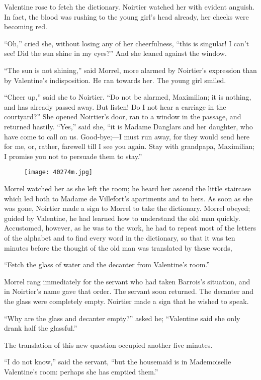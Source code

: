 Valentine rose to fetch the dictionary. Noirtier watched her with
evident anguish. In fact, the blood was rushing to the young girl’s
head already, her cheeks were becoming red.

“Oh,” cried she, without losing any of her cheerfulness, “this is
singular! I can’t see! Did the sun shine in my eyes?” And she leaned
against the window.

“The sun is not shining,” said Morrel, more alarmed by Noirtier’s
expression than by Valentine’s indisposition. He ran towards her. The
young girl smiled.

“Cheer up,” said she to Noirtier. “Do not be alarmed, Maximilian; it is
nothing, and has already passed away. But listen! Do I not hear a
carriage in the courtyard?” She opened Noirtier’s door, ran to a window
in the passage, and returned hastily. “Yes,” said she, “it is Madame
Danglars and her daughter, who have come to call on us. Good-bye;—I
must run away, for they would send here for me, or, rather, farewell
till I see you again. Stay with grandpapa, Maximilian; I promise you
not to persuade them to stay.”

\begin{figure}[ht]
\texttt{[image: 40274m.jpg]}
\end{figure}

Morrel watched her as she left the room; he heard her ascend the little
staircase which led both to Madame de Villefort’s apartments and to
hers. As soon as she was gone, Noirtier made a sign to Morrel to take
the dictionary. Morrel obeyed; guided by Valentine, he had learned how
to understand the old man quickly. Accustomed, however, as he was to
the work, he had to repeat most of the letters of the alphabet and to
find every word in the dictionary, so that it was ten minutes before
the thought of the old man was translated by these words,

“Fetch the glass of water and the decanter from Valentine’s room.”

Morrel rang immediately for the servant who had taken Barrois’s
situation, and in Noirtier’s name gave that order. The servant soon
returned. The decanter and the glass were completely empty. Noirtier
made a sign that he wished to speak.

“Why are the glass and decanter empty?” asked he; “Valentine said she
only drank half the glassful.”

The translation of this new question occupied another five minutes.

“I do not know,” said the servant, “but the housemaid is in
Mademoiselle Valentine’s room: perhaps she has emptied them.”

